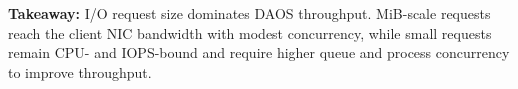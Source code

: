 \begin{takeaway}
\textbf{Takeaway:} I/O request size dominates DAOS throughput. MiB-scale requests reach the client NIC bandwidth with modest concurrency, while small requests remain CPU- and IOPS-bound and require higher queue and process concurrency to improve throughput.
\end{takeaway}









